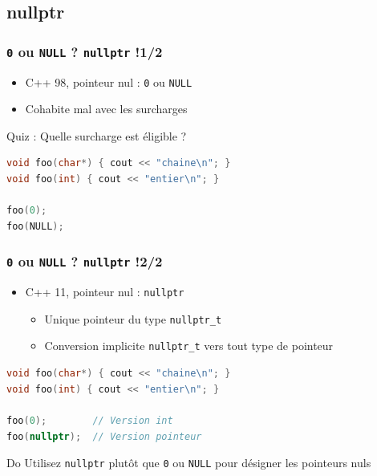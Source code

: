 \documentclass[C++.tex]{subfiles}
\begin{document}
\subsection*{nullptr}
\begin{frame}[fragile]
	\frametitle{\lstinline|0| ou \lstinline|NULL| ? \lstinline|nullptr| !\titlehfill{}1/2}
	\begin{itemize}
		\item C++ 98, pointeur nul : \lstinline|0| ou \lstinline|NULL|


		\item Cohabite mal avec les surcharges
	\end{itemize}

	\begin{block}{Quiz : Quelle surcharge est éligible ?}
		\begin{lstlisting}[language=C++]
void foo(char*) { cout << "chaine\n"; }
void foo(int) { cout << "entier\n"; }

foo(0);
foo(NULL);\end{lstlisting}
	\end{block}


\end{frame}

\begin{frame}[fragile]
	\frametitle{\lstinline|0| ou \lstinline|NULL| ? \lstinline|nullptr| !\titlehfill{}2/2}
	\begin{itemize}
		\item C++ 11, pointeur nul : \lstinline|nullptr|
		\begin{itemize}
			\item Unique pointeur du type \lstinline|nullptr_t|
			\item Conversion implicite \lstinline|nullptr_t| vers tout type de pointeur
		\end{itemize}
	\end{itemize}

	\begin{lstlisting}[language=C++]
void foo(char*) { cout << "chaine\n"; }
void foo(int) { cout << "entier\n"; }

foo(0);        // Version int
foo(nullptr);  // Version pointeur\end{lstlisting}

	\begin{exampleblock}{Do}
		Utilisez \lstinline|nullptr| plutôt que \lstinline|0| ou \lstinline|NULL| pour désigner les pointeurs nuls
	\end{exampleblock}
\end{frame}
\end{document}
